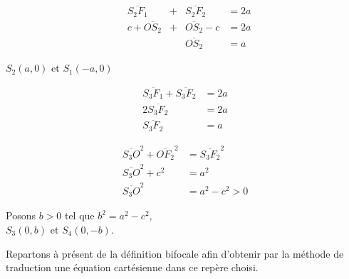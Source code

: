 \begin{eleve}


\vspace{1cm}
\begin{minipage}{0.3\textwidth}
    \begin{align*}
&\overline{S_2F_1} &+& \overline{S_2F_2} &= 2a\\
&c+\overline{OS_2} &+&  \overline{OS_2} -c &= 2a\\
&&&\overline{OS_2} &= a
\end{align*}  
\end{minipage}

\vspace{1cm}

$S_2(a,0)$ et $S_1(-a,0)$

\vspace{1cm}
\begin{minipage}{0.45\textwidth}
    \begin{align*}
\overline{S_3F_1} + \overline{S_3F_2} &= 2a\\
 2\overline{S_3F_2} &= 2a \tag*{(par symétrie)}\\
\overline{S_3F_2} &= a
\end{align*}  
\end{minipage}
\hspace{0.1 \textwidth}
\vrule
\begin{minipage}{0.45\textwidth}
    \begin{align*}
\overline{S_3O}^2 +  \overline{OF_2}^2 &= \overline{S_3F_2}^2 \\
\overline{S_3O}^2 + c^2&= a^2 \\ 
\overline{S_3O}^2 &= a^2 - c^2 >0
\end{align*}  
\end{minipage}

\vspace{1cm}
Posons $b>0$ tel que $b^2 = a^2 - c^2$,\\
$S_3(0,b)$ et $S_4(0,-b)$.
\end{eleve}

\newpage

Repartons à présent de la définition bifocale afin d'obtenir par la méthode de traduction une équation cartésienne dans ce repère choisi.


